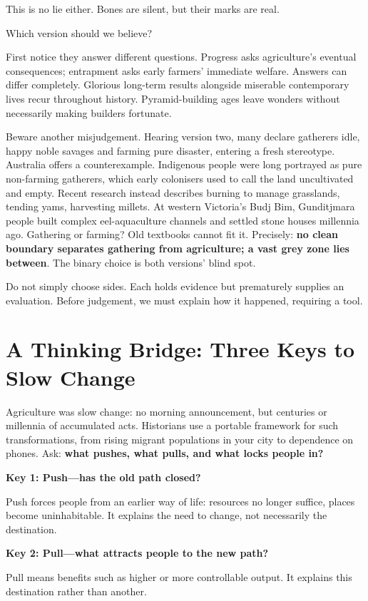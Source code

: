This is no lie either. Bones are silent, but their marks are real.

Which version should we believe?

First notice they answer different questions. Progress asks agriculture's eventual consequences; entrapment asks early farmers' immediate welfare. Answers can differ completely. Glorious long-term results alongside miserable contemporary lives recur throughout history. Pyramid-building ages leave wonders without necessarily making builders fortunate.

Beware another misjudgement. Hearing version two, many declare gatherers idle, happy noble savages and farming pure disaster, entering a fresh stereotype. Australia offers a counterexample. Indigenous people were long portrayed as pure non-farming gatherers, which early colonisers used to call the land uncultivated and empty. Recent research instead describes burning to manage grasslands, tending yams, harvesting millets. At western Victoria's Budj Bim, Gunditjmara people built complex eel-aquaculture channels and settled stone houses millennia ago. Gathering or farming? Old textbooks cannot fit it. Precisely: \textbf{no clean boundary separates gathering from agriculture; a vast grey zone lies between}. The binary choice is both versions' blind spot.

Do not simply choose sides. Each holds evidence but prematurely supplies an evaluation. Before judgement, we must explain how it happened, requiring a tool.

\section[Thinking Bridge: Three Keys to Change]{A Thinking Bridge: Three Keys to Slow Change}
Agriculture was slow change: no morning announcement, but centuries or millennia of accumulated acts. Historians use a portable framework for such transformations, from rising migrant populations in your city to dependence on phones. Ask: \textbf{what pushes, what pulls, and what locks people in?}

\textbf{Key 1: Push---has the old path closed?}

Push forces people from an earlier way of life: resources no longer suffice, places become uninhabitable. It explains the need to change, not necessarily the destination.

\textbf{Key 2: Pull---what attracts people to the new path?}

Pull means benefits such as higher or more controllable output. It explains this destination rather than another.

